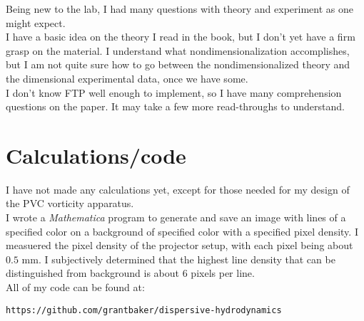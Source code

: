 \documentclass[11pt]{article}
\begin{document}
Being new to the lab, I had many questions with theory and experiment as one might expect.\\

I have a basic idea on the theory I read in the book, but I don't yet have a firm grasp on the material. I understand what nondimensionalization accomplishes, but I am not quite sure how to go between the nondimensionalized theory and the dimensional experimental data, once we have some.\\

I don't know FTP well enough to implement, so I have many comprehension questions on the paper. It may take a few more read-throughs to understand.

\section*{Calculations/code}

I have not made any calculations yet, except for those needed for my design of the PVC vorticity apparatus.\\

I wrote a \textit{Mathematica} program to generate and save an image with lines of a specified color on a background of specified color with a specified pixel density. I measuered the pixel density of the projector setup, with each pixel being about $0.5$ mm. I subjectively determined that the highest line density that can be distinguished from background is about $6$ pixels per line.\\

All of my code can be found at:

\texttt{https://github.com/grantbaker/dispersive-hydrodynamics}
\end{document}
